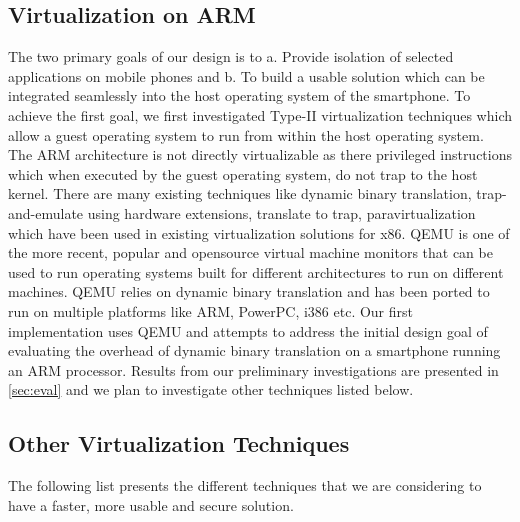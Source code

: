 \subsection{Virtualization on ARM}
The two primary goals of our design is to a. Provide isolation of selected applications on mobile phones and b. To build a usable solution which can be integrated seamlessly into the host operating system of the smartphone. To achieve the first goal, we first investigated Type-II virtualization techniques which allow a guest operating system to run from within the host operating system. The ARM architecture is not directly virtualizable as there privileged instructions which when executed by the guest operating system, do not trap to the host kernel. There are many existing techniques like dynamic binary translation, trap-and-emulate using hardware extensions, translate to trap, paravirtualization which have been used in existing virtualization solutions for x86. QEMU \cite{qemu} is one of the more recent, popular and opensource virtual machine monitors that can be used to run operating systems built for different architectures to run on different machines. QEMU relies on dynamic binary translation and has been ported to run on multiple platforms like ARM, PowerPC, i386 etc. Our first implementation uses QEMU and attempts to address the initial design goal of evaluating the overhead of dynamic binary translation on a smartphone running an ARM processor. Results from our preliminary investigations are presented in \ref{sec:eval} and we plan to investigate other techniques listed below.

\subsection{Other Virtualization Techniques}
The following list presents the different techniques that we are considering to have a faster, more usable and secure solution.

